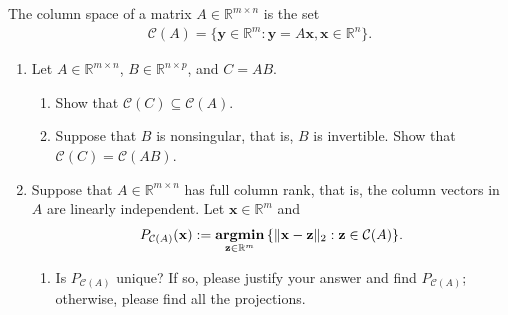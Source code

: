 \documentclass[11pt,letter,notitlepage]{article}
\DeclareMathOperator*{\argmin}{\bf argmin}
\begin{document}
\begin{solution}
	
\end{solution}


\newpage

\begin{exercise}
    The column space of a matrix $A\in\mathbb{R}^{m\times n}$ is the set
    \begin{align}\label{def:column-space}
        \mathcal{C}(A)=\{\mathbf{y}\in\mathbb{R}^m: \mathbf{y}=A\mathbf{x}, \mathbf{x}\in\mathbb{R}^n\}.
    \end{align}
    
    \begin{enumerate}
        \item Let $A\in\mathbb{R}^{m\times n}$, $B\in\mathbb{R}^{n\times p}$, and $C=AB$.
            \begin{enumerate}
                \item Show that $\mathcal{C}(C)\subseteq\mathcal{C}(A)$.
                
                \item Suppose that $B$ is nonsingular, that is, $B$ is invertible. Show that $\mathcal{C}(C)=\mathcal{C}(AB)$.
            \end{enumerate}
        
        \item\label{exercise:subspace-2} Suppose that $A\in\mathbb{R}^{m\times n}$ has full column rank, that is, the column vectors in $A$ are linearly independent. Let $\mathbf{x}\in\mathbb{R}^m$ and
                \begin{align}\label{prob:proj-subspace}
                    P_{\mathcal{C}(A)}(\mathbf{x}):=\argmin_{\mathbf{z}\in\mathbb{R}^m}\,\{\|\mathbf{x}-\mathbf{z}\|_2: \mathbf{z}\in\mathcal{C}(A)\}. 
                \end{align}
                    
                \begin{enumerate}
                        
                    \item Is $P_{\mathcal{C}(A)}$ unique? If so, please justify your answer and find $P_{\mathcal{C}(A)}$; otherwise, please find all the projections.
                        

\end{enumerate}
\end{enumerate}
\end{exercise}
\end{document}
